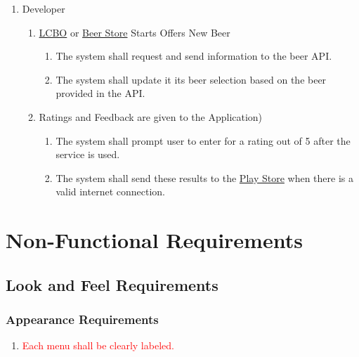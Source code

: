\documentclass[]{article}
\begin{document}
\begin{enumerate}[{VP}1.]
\begin{enumerate}[{BE1}.1]
	\end{enumerate}
	
	\item Developer
	
	\begin{enumerate}[{BE2}.1]
		\item {\underline{LCBO} or \underline{Beer Store} Starts Offers New Beer}
		\begin{enumerate}
			\item The system shall request and send information to the beer API. 
			\item The system shall update it its beer selection based on the beer provided in the API.
		\end{enumerate}
		
		\item {Ratings and Feedback are given to the Application) }
		\begin{enumerate}
			\item The system shall prompt user to enter for a rating out of 5 after the service is used. 
			\item The system shall send these results to the \underline{Play Store} when there is a valid internet connection.
		\end{enumerate}
		
	\end{enumerate}
	
\end{enumerate}

\section{Non-Functional Requirements}
\label{sec:non-functional_requirements}
\subsection{Look and Feel Requirements}
\label{sub:look_and_feel_requirements}

\subsubsection{Appearance Requirements}
\label{ssub:appearance_requirements}
\begin{enumerate}[{LF}1. ]
	\item \textcolor{red}{Each menu shall be clearly labeled.}
\end{enumerate}
\end{document}
